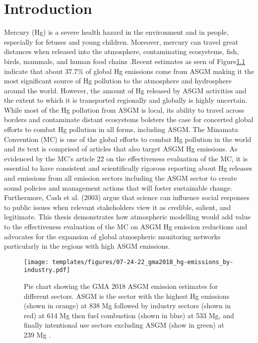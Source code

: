 
\chapter{Introduction}
Mercury (Hg) is a severe health hazard in the environment and in people, especially for fetuses and young children\cite{gibb_mercury_2014}. Moreover, mercury can travel great distances when released into the atmosphere, contaminating ecosystems, fish, birds, mammals, and human food chains \cite{esdaile_mercury_2018}.Recent estimates as seen of Figure\ref{fig:gma2018_hg-emissions_by-industry} indicate that about 37.7\% of global Hg emissions come from ASGM making it the most significant source of Hg pollution to the atmosphere and hydrosphere around the world\cite{unep_minamata_2019}. However, the amount of Hg released by ASGM activities and the extent to which it is transported regionally and globally is highly uncertain. While most of the Hg pollution from ASGM is local, its ability to travel across borders and contaminate distant ecosystems bolsters the case for concerted global efforts to combat Hg pollution in all forms, including ASGM. The Minamata Convention (MC) is one of the global efforts to combat Hg pollution in the world and its text is comprised of articles that also target ASGM Hg emissions. As evidenced by the MC's article 22 on the effectiveness evaluation of the MC, it is essential to have consistent and scientifically rigorous reporting about Hg releases and emissions from all emission sectors including the ASGM sector to create sound policies and management actions that will foster sustainable change. Furthermore, Cash et al. (2003) argue that science can influence social responses to public issues when relevant stakeholders view it as credible, salient, and legitimate. This thesis demonstrates how atmospheric modelling would add value to the effectiveness evaluation of the MC on ASGM Hg emission reductions and advocates for the expansion of global atmospheric monitoring networks particularly in the regions with high ASGM emissions. 

\begin{figure}[H]
  \texttt{[image: templates/figures/07-24-22\_gma2018\_hg-emissions\_by-industry.pdf]}
  \centering
  \caption{Pie chart showing the GMA 2018 ASGM \hg emission estimates for different sectors. ASGM is the sector with the highest Hg emissions (shown in orange) at 838 Mg followed by industry sectors (shown in red) at 614 Mg then fuel combustion (shown in blue) at 533 Mg, and finally intentional use sectors excluding ASGM (show in green) at 239 Mg \cite{united_nations_environment_programme_technical_2019}.}
  \label{fig:gma2018_hg-emissions_by-industry}
\end{figure}
\FloatBarrier

